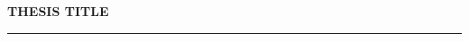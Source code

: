 \newpage
\thispagestyle{empty}

\mbox{}

\vspace{7cm}

\begin{flushright}

\textbf{\LARGE THESIS TITLE}

\vspace{0.1cm}

\rule{\linewidth}{0.15cm}%
\end{flushright}
